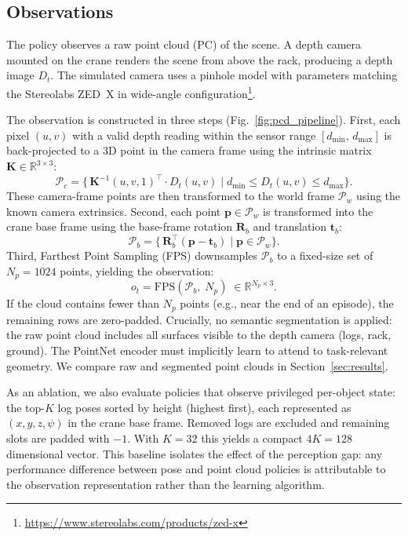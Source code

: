 \documentclass[conference]{IEEEtran}
\begin{document}
\subsection{Observations}
\label{sec:obs}
The policy observes a raw point cloud (PC) of the scene.
A depth camera mounted on the crane renders the scene from above the rack, producing a depth image $D_t$.
The simulated camera uses a pinhole model with parameters matching the Stereolabs ZED~X in wide-angle configuration\footnote{\url{https://www.stereolabs.com/products/zed-x}}.

The observation is constructed in three steps (Fig.~\ref{fig:pcd_pipeline}).
First, each pixel $(u,v)$ with a valid depth reading within the sensor range $[d_{\min},\, d_{\max}]$ is back-projected to a 3D point in the camera frame using the intrinsic matrix $\mathbf{K} \in \mathbb{R}^{3 \times 3}$:
\begin{equation}
    \mathcal{P}_c = \big\{\, \mathbf{K}^{-1}(u,v,1)^\top \!\cdot D_t(u,v) \;\big|\; d_{\min} \le D_t(u,v) \le d_{\max} \big\}.
\end{equation}
These camera-frame points are then transformed to the world frame $\mathcal{P}_w$ using the known camera extrinsics.
Second, each point $\mathbf{p} \in \mathcal{P}_w$ is transformed into the crane base frame using the base-frame rotation $\mathbf{R}_b$ and translation $\mathbf{t}_b$:
\begin{equation}
    \mathcal{P}_b = \big\{\, \mathbf{R}_b^\top(\mathbf{p} - \mathbf{t}_b) \;\big|\; \mathbf{p} \in \mathcal{P}_w \big\}.
\end{equation}
Third, Farthest Point Sampling (FPS) downsamples $\mathcal{P}_b$ to a fixed-size set of $N_p = 1024$ points, yielding the observation:
\begin{equation}
    o_t = \mathrm{FPS}(\mathcal{P}_b,\; N_p) \;\in \mathbb{R}^{N_p \times 3}.
\end{equation}
If the cloud contains fewer than $N_p$ points (e.g., near the end of an episode), the remaining rows are zero-padded.
Crucially, no semantic segmentation is applied: the raw point cloud includes all surfaces visible to the depth camera (logs, rack, ground).
The PointNet encoder must implicitly learn to attend to task-relevant geometry.
We compare raw and segmented point clouds in Section~\ref{sec:results}.

As an ablation, we also evaluate policies that observe privileged per-object state: the top-$K$ log poses sorted by height (highest first), each represented as $(x,y,z,\psi)$ in the crane base frame.
Removed logs are excluded and remaining slots are padded with $-1$.
With $K\!=\!32$ this yields a compact $4K = 128$ dimensional vector.
This baseline isolates the effect of the perception gap: any performance difference between pose and point cloud policies is attributable to the observation representation rather than the learning algorithm.
\end{document}
